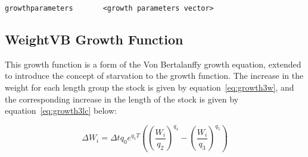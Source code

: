 \documentclass[10pt,twoside]{book}
\begin{document}
{\small\begin{verbatim}
growthparameters       <growth parameters vector>
\end{verbatim}}

%
%
%

\subsection{WeightVB Growth Function}\label{subsec:growth3}
This growth function is a form of the Von Bertalanffy growth equation, extended to introduce the concept of starvation to the growth function.  The increase in the weight for each length group the stock is given by equation~\ref{eq:growth3w}, and the corresponding increase in the length of the stock is given by equation~\ref{eq:growth3lc} below:

\begin{equation}\label{eq:growth3w}
\Delta W_{i} = \Delta t q_{0} e^{q_{1} T} \left( \left( \frac{W_{i}}{q_{2}} \right)^{q_{4}} - \left( \frac{W_{i}}{q_{3}} \right)^{q_{5}} \right)
\end{equation}
\end{document}
